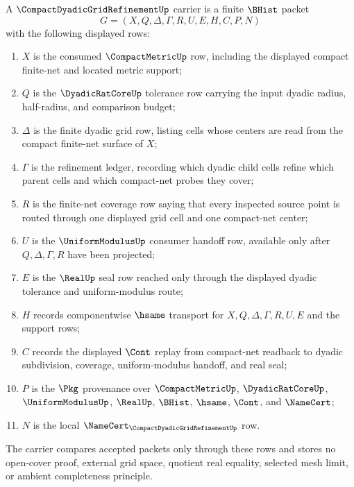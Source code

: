 \begin{definition}
\label{def:compact-dyadic-grid-refinement-carrier}
A $\CompactDyadicGridRefinementUp$ carrier is a finite $\BHist$ packet
$$
G=(X,Q,\Delta,\Gamma,R,U,E,H,C,P,N)
$$
with the following displayed rows:
\begin{enumerate}
\item $X$ is the consumed $\CompactMetricUp$ row, including the displayed compact finite-net and located metric support;
\item $Q$ is the $\DyadicRatCoreUp$ tolerance row carrying the input dyadic radius, half-radius, and comparison budget;
\item $\Delta$ is the finite dyadic grid row, listing cells whose centers are read from the compact finite-net surface of $X$;
\item $\Gamma$ is the refinement ledger, recording which dyadic child cells refine which parent cells and which compact-net probes they cover;
\item $R$ is the finite-net coverage row saying that every inspected source point is routed through one displayed grid cell and one compact-net center;
\item $U$ is the $\UniformModulusUp$ consumer handoff row, available only after $Q,\Delta,\Gamma,R$ have been projected;
\item $E$ is the $\RealUp$ seal row reached only through the displayed dyadic tolerance and uniform-modulus route;
\item $H$ records componentwise $\hsame$ transport for $X,Q,\Delta,\Gamma,R,U,E$ and the support rows;
\item $C$ records the displayed $\Cont$ replay from compact-net readback to dyadic subdivision, coverage, uniform-modulus handoff, and real seal;
\item $P$ is the $\Pkg$ provenance over $\CompactMetricUp$, $\DyadicRatCoreUp$, $\UniformModulusUp$, $\RealUp$, $\BHist$, $\hsame$, $\Cont$, and $\NameCert$;
\item $N$ is the local $\NameCert_{\CompactDyadicGridRefinementUp}$ row.
\end{enumerate}
The carrier compares accepted packets only through these rows and stores no open-cover proof, external grid space, quotient real equality, selected mesh limit, or ambient completeness principle.
\end{definition}

